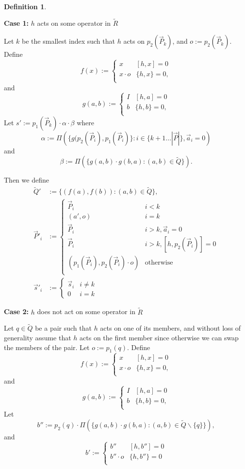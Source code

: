 \documentclass[12pt]{amsbook}
\theoremstyle{plain}
\theoremstyle{definition}
\newtheorem{definition}{Definition}
\theoremstyle{remark}
\newcommand{\lst}{\vec}
\newcommand{\set}{\tilde}
\newcommand{\paren}[1]{\left(#1\right)}
\begin{document}
\begin{definition}
\begin{center}
\textbf{Case 1:} $h$ acts on some operator in $\set R$
\end{center}

Let $k$ be the smallest index such that $h$ acts on $p_2(\lst P_k)$, and $o:=p_2(\lst P_k)$.  Define
$$
f(x) :=
\begin{cases}
x & [h,x] = 0 \\
x\cdot o & \{h,x\} = 0, \\
\end{cases}
$$
and
$$
g(a,b) :=
\begin{cases}
I & [h,a] = 0 \\
b & \{h,b\} = 0, \\
\end{cases}
$$
Let $s':=p_1(\lst P_k)\cdot \alpha \cdot \beta$ where
$$\alpha := \Pi\paren{\{g(p_2(\lst P_i),p_1(\lst P_i)\}:i\in\{k+1\dots |\lst P|\},\lst a_i=0}$$
and
$$\beta := \Pi\paren{\{g(a,b)\cdot g(b,a):(a,b)\in\set Q\}}.$$

Then we define
$$
\begin{aligned}
\set Q'&:= \{(f(a),f(b)):(a,b)\in\set Q\},\\
\lst P'_i&:=
\begin{cases}
\lst P_i & i < k \\
(a',o) & i = k \\
\lst P_i & i > k, \lst a_i=0 \\
\lst P_i & i > k, [h,p_2(\lst P_i)]=0 \\
(p_1(\lst P_i),p_2(\lst P_i)\cdot o) & \text{otherwise} \\
\end{cases}\\
\lst s'_i&:=
\begin{cases}
\lst s_i & i\ne k\\
0 & i =k
\end{cases}
\end{aligned}
$$

\begin{center}
\textbf{Case 2:} $h$ does not act on some operator in $\set R$
\end{center}

Let $q\in\set Q$ be a pair such that $h$ acts on one of its members, and without loss of generality assume that $h$ acts on the first member since otherwise we can swap the members of the pair.  Let $o:=p_1(q)$.
Define
$$
f(x) :=
\begin{cases}
x & [h,x] = 0 \\
x\cdot o & \{h,x\} = 0, \\
\end{cases}
$$
and
$$
g(a,b) :=
\begin{cases}
I & [h,a] = 0 \\
b & \{h,b\} = 0, \\
\end{cases}
$$
Let $$b'':=p_2(q)\cdot\Pi\paren{\{g(a,b)\cdot g(b,a):(a,b)\in\set Q\backslash\{q\}\}},$$ and
$$b':=
\begin{cases}
b'' & [h,b'']=0 \\
b''\cdot o & \{h,b''\}=0 \\
\end{cases}
$$


\end{definition}
\end{document}
